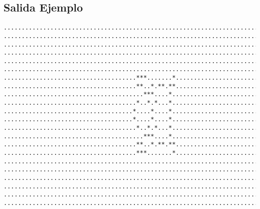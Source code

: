 \subsection*{Salida Ejemplo}
\begin{verbatim}
........................................................................................
........................................................................................
........................................................................................
........................................................................................
........................................................................................
........................................................................................
.....................................***.......*........................................
.....................................**..*.**.**........................................
.......................................***....*.........................................
.....................................*..*.*...*.........................................
....................................*....*....*.........................................
....................................*....*....*.........................................
.....................................*..*.*...*.........................................
.......................................***....*.........................................
.....................................**..*.**.**........................................
.....................................***.......*........................................
........................................................................................
........................................................................................
........................................................................................
........................................................................................
........................................................................................
........................................................................................
\end{verbatim}



